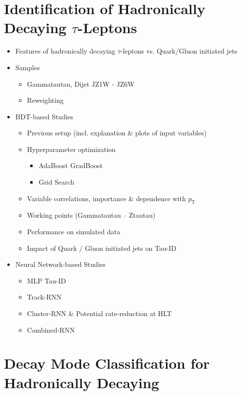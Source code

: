 \section{Identification of Hadronically Decaying $\tau$-Leptons}

\begin{itemize}
\item Features of hadronically decaying $\tau$-leptons vs. Quark/Gluon
  initiated jets

\item Samples
  \begin{itemize}
  \item Gammatautau, Dijet JZ1W - JZ6W
  \item Reweighting
  \end{itemize}

\item BDT-based Studies
  \begin{itemize}
  \item Previous setup (incl. explanation \& plots of input variables)
  \item Hyperparameter optimization
    \begin{itemize}
    \item AdaBoost \textrightarrow GradBoost
    \item Grid Search
    \end{itemize}
  \item Variable correlations, importance \& dependence with $p_\mathrm{T}$
  \item Working points (Gammatautau -- Ztautau)
  \item Performance on simulated data
  \item Impact of Quark / Gluon initiated jets on Tau-ID
  \end{itemize}

\item Neural Network-based Studies
  \begin{itemize}
  \item MLP Tau-ID
  \item Track-RNN
  \item Cluster-RNN \& Potential rate-reduction at HLT
  \item Combined-RNN
  \end{itemize}

\end{itemize}

\section{Decay Mode Classification for Hadronically Decaying}

